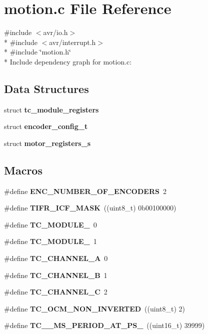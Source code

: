 \section{motion.\+c File Reference}
\label{motion_8c}
{\ttfamily \#include $<$avr/io.\+h$>$}\\*
{\ttfamily \#include $<$avr/interrupt.\+h$>$}\\*
{\ttfamily \#include \char`\"{}motion.\+h\char`\"{}}\\*
Include dependency graph for motion.\+c\+:
\subsection*{Data Structures}
\begin{DoxyCompactItemize}
\item 
struct {\bf tc\+\_\+module\+\_\+registers}
\item 
struct {\bf encoder\+\_\+config\+\_\+t}
\item 
struct {\bf motor\+\_\+registers\+\_\+s}
\end{DoxyCompactItemize}
\subsection*{Macros}
\begin{DoxyCompactItemize}
\item 
\#define {\bf E\+N\+C\+\_\+\+N\+U\+M\+B\+E\+R\+\_\+\+O\+F\+\_\+\+E\+N\+C\+O\+D\+E\+RS}~2
\item 
\#define {\bf T\+I\+F\+R\+\_\+\+I\+C\+F\+\_\+\+M\+A\+SK}~((uint8\+\_\+t) 0b00100000)
\item 
\#define {\bf T\+C\+\_\+\+M\+O\+D\+U\+L\+E\+\_}~0
\item 
\#define {\bf T\+C\+\_\+\+M\+O\+D\+U\+L\+E\+\_}~1
\item 
\#define {\bf T\+C\+\_\+\+C\+H\+A\+N\+N\+E\+L\+\_\+A}~0
\item 
\#define {\bf T\+C\+\_\+\+C\+H\+A\+N\+N\+E\+L\+\_\+B}~1
\item 
\#define {\bf T\+C\+\_\+\+C\+H\+A\+N\+N\+E\+L\+\_\+C}~2
\item 
\#define {\bf T\+C\+\_\+\+O\+C\+M\+\_\+\+N\+O\+N\+\_\+\+I\+N\+V\+E\+R\+T\+ED}~((uint8\+\_\+t) 2)
\item 
\#define {\bf T\+C\+\_\+\_\+\+M\+S\+\_\+\+P\+E\+R\+I\+O\+D\+\_\+\+A\+T\+\_\+\+P\+S\+\_}~((uint16\+\_\+t) 39999)
\end{DoxyCompactItemize}

